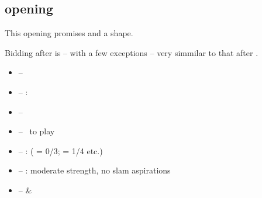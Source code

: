 \subsection{\ctr{2\nt} opening}
\label{subsec:2nt-op}

This opening promises  and a \bal\/ shape.

Bidding after \ctr{2\nt} is -- with a few exceptions -- very simmilar to that after
\hyperref[subsec:1nt-op]{\ctr{1\nt}}. \vspace{1em}

\begin{itemize}
  \item \ctr{3\c} -- \hyperref[subsec:puppet-stayman]{}
  \item \ctr{3\d/\h} -- : 
  \item \ctr{3\s} -- \hyperref[subsec:minor-stayman]{}
  \item \ctr{3\nt} -- \nat\ to play
  \item \ctr{4\c} -- :  ( = 0/3;  = 1/4 etc.)
  \item \ctr{4\d/\h} -- :  moderate strength, no slam aspirations
  \item \ctr{4\s} --  \&  \question
\end{itemize}

